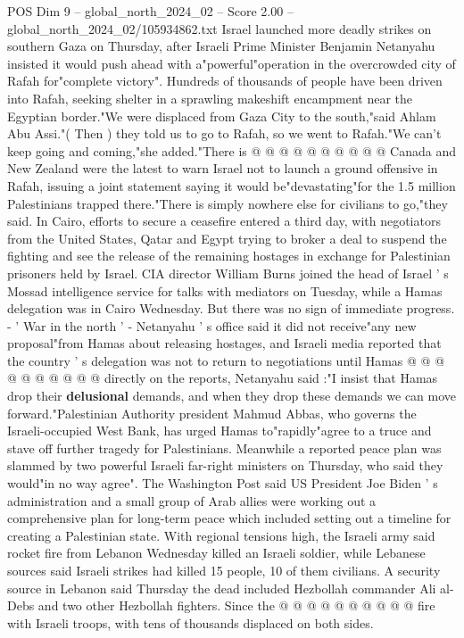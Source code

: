 \begin{textsample}{POS Dim 9 – global\_north\_2024\_02 – Score 2.00 – global\_north\_2024\_02/105934862.txt}
Israel launched more deadly strikes on southern Gaza on Thursday, after Israeli Prime Minister Benjamin Netanyahu insisted it would push ahead with a"powerful"operation in the overcrowded city of Rafah for"complete victory".
Hundreds of thousands of people have been driven into Rafah, seeking shelter in a sprawling makeshift encampment near the Egyptian border."We were displaced from Gaza City to the south,"said Ahlam Abu Assi."( Then ) they told us to go to Rafah, so we went to Rafah."We can't keep going and coming,"she added."There is @ @ @ @ @ @ @ @ @ @ Canada and New Zealand were the latest to warn Israel not to launch a ground offensive in Rafah, issuing a joint statement saying it would be"devastating"for the 1.5 million Palestinians trapped there."There is simply nowhere else for civilians to go,"they said.
In Cairo, efforts to secure a ceasefire entered a third day, with negotiators from the United States, Qatar and Egypt trying to broker a deal to suspend the fighting and see the release of the remaining hostages in exchange for Palestinian prisoners held by Israel.
CIA director William Burns joined the head of Israel ' s Mossad intelligence service for talks with mediators on Tuesday, while a Hamas delegation was in Cairo Wednesday.
But there was no sign of immediate progress. - ' War in the north ' - Netanyahu ' s office said it did not receive"any new proposal"from Hamas about releasing hostages, and Israeli media reported that the country ' s delegation was not to return to negotiations until Hamas @ @ @ @ @ @ @ @ @ @ directly on the reports, Netanyahu said :"I insist that Hamas drop their \textbf{delusional} demands, and when they drop these demands we can move forward."Palestinian Authority president Mahmud Abbas, who governs the Israeli-occupied West Bank, has urged Hamas to"rapidly"agree to a truce and stave off further tragedy for Palestinians.
Meanwhile a reported peace plan was slammed by two powerful Israeli far-right ministers on Thursday, who said they would"in no way agree".
The Washington Post said US President Joe Biden ' s administration and a small group of Arab allies were working out a comprehensive plan for long-term peace which included setting out a timeline for creating a Palestinian state.
With regional tensions high, the Israeli army said rocket fire from Lebanon Wednesday killed an Israeli soldier, while Lebanese sources said Israeli strikes had killed 15 people, 10 of them civilians.
A security source in Lebanon said Thursday the dead included Hezbollah commander Ali al-Debs and two other Hezbollah fighters.
Since the @ @ @ @ @ @ @ @ @ @ fire with Israeli troops, with tens of thousands displaced on both sides.

\end{textsample}

